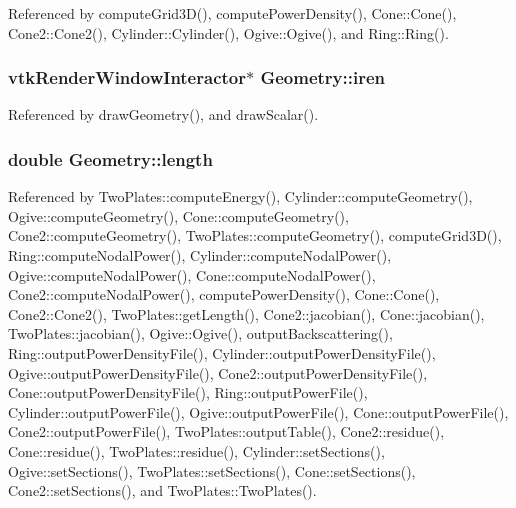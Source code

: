 Referenced by compute\-Grid3\-D(), compute\-Power\-Density(), Cone\-::\-Cone(), Cone2\-::\-Cone2(), Cylinder\-::\-Cylinder(), Ogive\-::\-Ogive(), and Ring\-::\-Ring().

\hypertarget{classGeometry_a6563f9a823d1dcee59554a5d093d6c73}{
\subsubsection[{iren}]{\setlength{\rightskip}{0pt plus 5cm}vtk\-Render\-Window\-Interactor$\ast$ Geometry\-::iren\hspace{0.3cm}{\ttfamily [protected]}}}\label{classGeometry_a6563f9a823d1dcee59554a5d093d6c73}


Referenced by draw\-Geometry(), and draw\-Scalar().

\hypertarget{classGeometry_a83cd2f4ce607b1b70227780181b197c6}{
\subsubsection[{length}]{\setlength{\rightskip}{0pt plus 5cm}double Geometry\-::length\hspace{0.3cm}{\ttfamily [protected]}}}\label{classGeometry_a83cd2f4ce607b1b70227780181b197c6}


Referenced by Two\-Plates\-::compute\-Energy(), Cylinder\-::compute\-Geometry(), Ogive\-::compute\-Geometry(), Cone\-::compute\-Geometry(), Cone2\-::compute\-Geometry(), Two\-Plates\-::compute\-Geometry(), compute\-Grid3\-D(), Ring\-::compute\-Nodal\-Power(), Cylinder\-::compute\-Nodal\-Power(), Ogive\-::compute\-Nodal\-Power(), Cone\-::compute\-Nodal\-Power(), Cone2\-::compute\-Nodal\-Power(), compute\-Power\-Density(), Cone\-::\-Cone(), Cone2\-::\-Cone2(), Two\-Plates\-::get\-Length(), Cone2\-::jacobian(), Cone\-::jacobian(), Two\-Plates\-::jacobian(), Ogive\-::\-Ogive(), output\-Backscattering(), Ring\-::output\-Power\-Density\-File(), Cylinder\-::output\-Power\-Density\-File(), Ogive\-::output\-Power\-Density\-File(), Cone2\-::output\-Power\-Density\-File(), Cone\-::output\-Power\-Density\-File(), Ring\-::output\-Power\-File(), Cylinder\-::output\-Power\-File(), Ogive\-::output\-Power\-File(), Cone\-::output\-Power\-File(), Cone2\-::output\-Power\-File(), Two\-Plates\-::output\-Table(), Cone2\-::residue(), Cone\-::residue(), Two\-Plates\-::residue(), Cylinder\-::set\-Sections(), Ogive\-::set\-Sections(), Two\-Plates\-::set\-Sections(), Cone\-::set\-Sections(), Cone2\-::set\-Sections(), and Two\-Plates\-::\-Two\-Plates().

